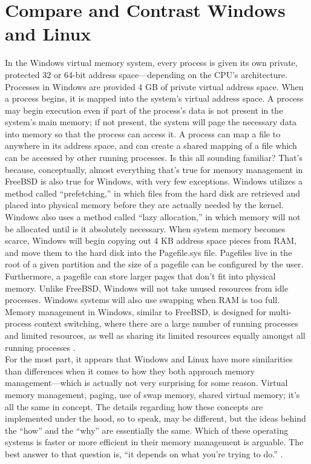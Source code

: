 \documentclass[letterpaper,10pt,draftclsnofoot,onecolumn]{IEEEtran}
\begin{document}
\section{Compare and Contrast Windows and Linux}
In the Windows virtual memory system, every process is given its own private, protected 32 or 64-bit address space–--depending on the CPU’s architecture. Processes in Windows are provided 4 GB of private virtual address space. When a process begins, it is mapped into the system’s virtual address space. A process may begin execution even if part of the process’s data is not present in the system’s main memory; if not present, the system will page the necessary data into memory so that the process can access it. A process can map a file to anywhere in its address space, and can create a shared mapping of a file which can be accessed by other running processes. Is this all sounding familiar? That’s because, conceptually, almost everything that’s true for memory management in FreeBSD is also true for Windows, with very few exceptions. Windows utilizes a method called “prefetching,” in which files from the hard disk are retrieved and placed into physical memory before they are actually needed by the kernel. Windows also uses a method called “lazy allocation,” in which memory will not be allocated until is it absolutely necessary. When system memory becomes scarce, Windows will begin copying out 4 KB address space pieces from RAM, and move them to the hard disk into the Pagefile.sys file. Pagefiles live in the root of a given partition and the size of a pagefile can be configured by the user. Furthermore, a pagefile can store larger pages that don’t fit into physical memory. Unlike FreeBSD, Windows will not take unused resources from idle processes. Windows systems will also use swapping when RAM is too full. Memory management in Windows, similar to FreeBSD, is designed for multi-process context switching, where there are a large number of running processes and limited resources, as well as sharing its limited resources equally amongst all running processes \cite{MSWindows1} \cite{MSWindows2}.\\
For the most part, it appears that Windows and Linux have more similarities than differences when it comes to how they both approach memory management–--which is actually not very surprising for some reason. Virtual memory management, paging, use of swap memory, shared virtual memory; it’s all the same in concept. The details regarding how these concepts are implemented under the hood, so to speak, may be different, but the ideas behind the “how” and the “why” are essentially the same. Which of these operating systems is faster or more efficient in their memory management is arguable. The best answer to that question is, “it depends on what you’re trying to do.” \cite{Linux1} \cite{Linux2}.\\
\end{document}
